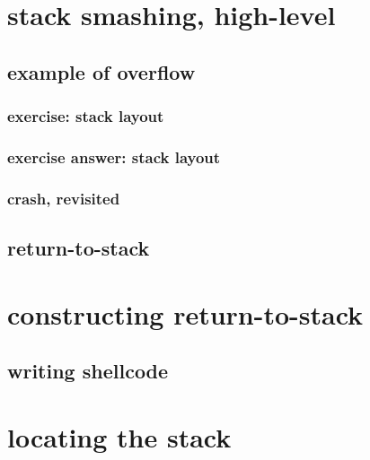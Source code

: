 
\section{stack smashing, high-level}


\subsection{example of overflow}


\subsubsection{exercise: stack layout}


\subsubsection{exercise answer: stack layout}


\subsubsection{crash, revisited}


\subsection{return-to-stack}


\section{constructing return-to-stack}


\subsection{writing shellcode}




\section{locating the stack}
